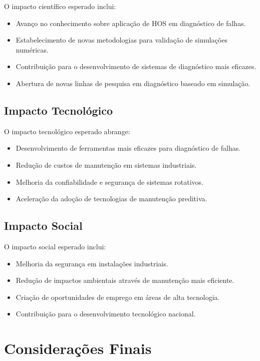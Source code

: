O impacto científico esperado inclui:

\begin{itemize}
    \item Avanço no conhecimento sobre aplicação de HOS em diagnóstico de falhas.
    \item Estabelecimento de novas metodologias para validação de simulações numéricas.
    \item Contribuição para o desenvolvimento de sistemas de diagnóstico mais eficazes.
    \item Abertura de novas linhas de pesquisa em diagnóstico baseado em simulação.
\end{itemize}

\subsection{Impacto Tecnológico}

O impacto tecnológico esperado abrange:

\begin{itemize}
    \item Desenvolvimento de ferramentas mais eficazes para diagnóstico de falhas.
    \item Redução de custos de manutenção em sistemas industriais.
    \item Melhoria da confiabilidade e segurança de sistemas rotativos.
    \item Aceleração da adoção de tecnologias de manutenção preditiva.
\end{itemize}

\subsection{Impacto Social}

O impacto social esperado inclui:

\begin{itemize}
    \item Melhoria da segurança em instalações industriais.
    \item Redução de impactos ambientais através de manutenção mais eficiente.
    \item Criação de oportunidades de emprego em áreas de alta tecnologia.
    \item Contribuição para o desenvolvimento tecnológico nacional.
\end{itemize}

\section{Considerações Finais}

